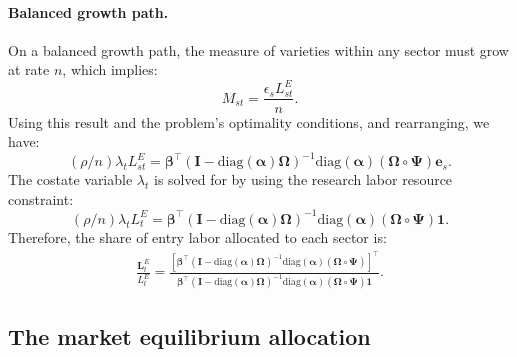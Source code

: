 \documentclass[12pt]{article}
\begin{document}
\paragraph{Balanced growth path.} On a balanced growth path, the measure of varieties within any sector must grow at rate $n$, which implies:
\begin{equation*}
    M_{st} = \frac{\epsilon_s L_{st}^E}{n}.
\end{equation*}
Using this result and the problem's optimality conditions, and rearranging, we have:
\begin{equation*}
    (\rho / n) \lambda_t L_{st}^E = \bm{\beta}^{\top} (\mathbf{I} - \text{diag}(\bm{\alpha}) \bm{\Omega})^{-1} \text{diag}(\bm{\alpha}) (\bm{\Omega} \circ \bm{\Psi}) \mathbf{e}_s.
\end{equation*}
The costate variable $\lambda_t$ is solved for by using the research labor resource constraint:
\begin{equation*}
    (\rho / n) \lambda_t L_t^E = \bm{\beta}^{\top} (\mathbf{I} - \text{diag}(\bm{\alpha}) \bm{\Omega})^{-1} \text{diag}(\bm{\alpha}) (\bm{\Omega} \circ \bm{\Psi}) \mathbf{1}.
\end{equation*}
Therefore, the share of entry labor allocated to each sector is:
\begin{align*}
    \frac{\mathbf{L}_t^E}{L_t^E} = \frac{[\bm{\beta}^{\top} (\mathbf{I} - \text{diag}(\bm{\alpha}) \bm{\Omega})^{-1} \text{diag}(\bm{\alpha}) (\bm{\Omega} \circ \bm{\Psi})]^{\top}}{\bm{\beta}^{\top} (\mathbf{I} - \text{diag}(\bm{\alpha}) \bm{\Omega})^{-1} \text{diag}(\bm{\alpha}) (\bm{\Omega} \circ \bm{\Psi}) \mathbf{1}}.
\end{align*}

\subsection{The market equilibrium allocation}
\label{a:market equilibrium allocation}
\end{document}
